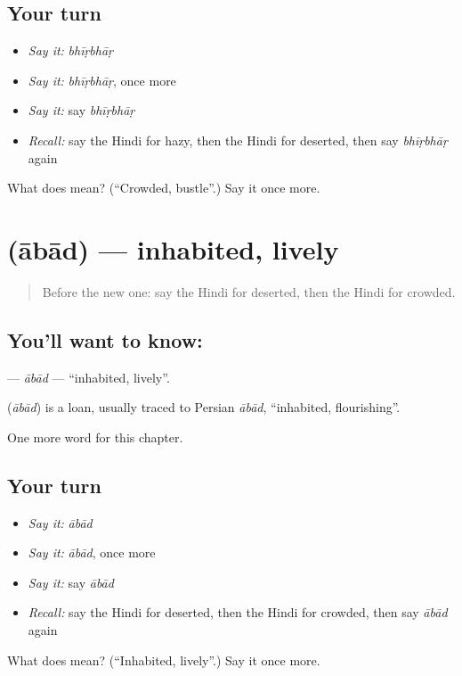 \subsection*{Your turn}
\begin{itemize}
\raggedright
  \item \emph{Say it:} \emph{bhīṛbhāṛ}
  \item \emph{Say it:} \emph{bhīṛbhāṛ}, once more
  \item \emph{Say it:} say \emph{bhīṛbhāṛ}
  \item \emph{Recall:} say the Hindi for hazy, then the Hindi for deserted, then say \emph{bhīṛbhāṛ} again
\end{itemize}

\begin{tcolorbox}[breakable,colback=teal!4,colframe=teal!35!black,title={Before you move on}]
What does  mean? (\textquotedblleft{}Crowded, bustle\textquotedblright{}.) Say it once more.
\end{tcolorbox}
\section[\texorpdfstring{\hi{आबाद} (ābād)}{आबाद (ābād)}]{ (ābād) — inhabited, lively}

\label{lesson:HI-C239-abad}



\begin{quote}
Before the new one: say the Hindi for deserted, then the Hindi for crowded.
\end{quote}

\subsection*{You'll want to know: }
\textbf{} — \emph{ābād} — \textquotedblleft{}inhabited, lively\textquotedblright{}.

\begin{cousinweb}
\textbf{} (\emph{ābād}) is a loan, usually traced to Persian \emph{ābād}, \textquotedblleft{}inhabited, flourishing\textquotedblright{}.
\end{cousinweb}

\begin{grammarlens}[title={What you've built}]
One more word for this chapter.
\end{grammarlens}

\subsection*{Your turn}
\begin{itemize}
\raggedright
  \item \emph{Say it:} \emph{ābād}
  \item \emph{Say it:} \emph{ābād}, once more
  \item \emph{Say it:} say \emph{ābād}
  \item \emph{Recall:} say the Hindi for deserted, then the Hindi for crowded, then say \emph{ābād} again
\end{itemize}

\begin{tcolorbox}[breakable,colback=teal!4,colframe=teal!35!black,title={Before you move on}]
What does  mean? (\textquotedblleft{}Inhabited, lively\textquotedblright{}.) Say it once more.
\end{tcolorbox}
